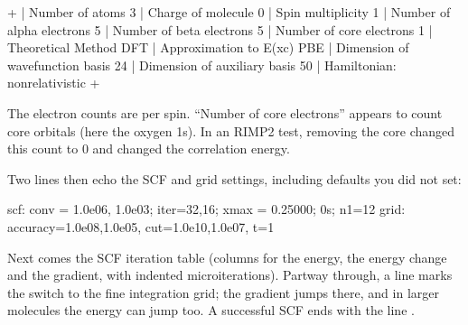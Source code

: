 \documentclass[letterpaper,10pt,english,openany,oneside]{sphinxmanual}
\begin{document}
\begin{sphinxVerbatim}[commandchars=\\\{\}]
 +\PYGZhy{}\PYGZhy{}\PYGZhy{}\PYGZhy{}\PYGZhy{}\PYGZhy{}\PYGZhy{}\PYGZhy{}\PYGZhy{}\PYGZhy{}\PYGZhy{}\PYGZhy{}\PYGZhy{}\PYGZhy{}\PYGZhy{}\PYGZhy{}\PYGZhy{}\PYGZhy{}\PYGZhy{}\PYGZhy{}\PYGZhy{}\PYGZhy{}\PYGZhy{}\PYGZhy{}\PYGZhy{}\PYGZhy{}\PYGZhy{}\PYGZhy{}\PYGZhy{}\PYGZhy{}\PYGZhy{}\PYGZhy{}\PYGZhy{}\PYGZhy{}\PYGZhy{}\PYGZhy{}\PYGZhy{}\PYGZhy{}\PYGZhy{}
 | Number of atoms                      3
 | Charge of molecule                   0
 | Spin multiplicity                    1
 | Number of alpha electrons            5
 | Number of beta  electrons            5
 | Number of core  electrons            1
 | Theoretical Method                 DFT
 | Approximation to E(xc)             PBE
 | Dimension of wavefunction basis     24
 | Dimension of   auxiliary  basis     50
 | Hamiltonian: non\PYGZhy{}relativistic
 +\PYGZhy{}\PYGZhy{}\PYGZhy{}\PYGZhy{}\PYGZhy{}\PYGZhy{}\PYGZhy{}\PYGZhy{}\PYGZhy{}\PYGZhy{}\PYGZhy{}\PYGZhy{}\PYGZhy{}\PYGZhy{}\PYGZhy{}\PYGZhy{}\PYGZhy{}\PYGZhy{}\PYGZhy{}\PYGZhy{}\PYGZhy{}\PYGZhy{}\PYGZhy{}\PYGZhy{}\PYGZhy{}\PYGZhy{}\PYGZhy{}\PYGZhy{}\PYGZhy{}\PYGZhy{}\PYGZhy{}\PYGZhy{}\PYGZhy{}\PYGZhy{}\PYGZhy{}\PYGZhy{}\PYGZhy{}\PYGZhy{}\PYGZhy{}
\end{sphinxVerbatim}



\sphinxAtStartPar
The electron counts are per spin. “Number of core electrons” appears to count core orbitals (here the oxygen 1s).
In an RI\sphinxhyphen{}MP2 test, removing the core changed this count to 0 and changed the correlation energy.



\sphinxAtStartPar
Two lines then echo the SCF and grid settings, including defaults you did not set:

\begin{sphinxVerbatim}[commandchars=\\\{\}]
 scf: conv = 1.0e\PYGZhy{}06, 1.0e\PYGZhy{}03; iter=32,16; xmax = 0.25000; 0s; n1=12
 grid: accuracy=1.0e\PYGZhy{}08,1.0e\PYGZhy{}05, cut=1.0e\PYGZhy{}10,1.0e\PYGZhy{}07, t=\PYGZhy{}1
\end{sphinxVerbatim}



\sphinxAtStartPar
Next comes the SCF iteration table (columns for the energy, the energy change and the gradient, with indented
micro\sphinxhyphen{}iterations). Partway through, a  line marks the switch to the fine integration grid; the gradient
jumps there, and in larger molecules the energy can jump too. A successful SCF ends with the line .
\end{document}
